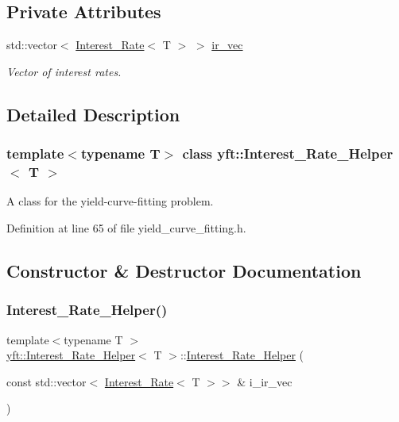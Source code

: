 \subsection*{Private Attributes}
\begin{DoxyCompactItemize}
\item 
std\+::vector$<$ \hyperlink{structyft_1_1_interest___rate}{Interest\+\_\+\+Rate}$<$ T $>$ $>$ \hyperlink{classyft_1_1_interest___rate___helper_aaa22a1a41fd5eead9ea61136ebc8446c}{ir\+\_\+vec}
\begin{DoxyCompactList}\small\item\em Vector of interest rates. \end{DoxyCompactList}\end{DoxyCompactItemize}


\subsection{Detailed Description}
\subsubsection*{template$<$typename T$>$\newline
class yft\+::\+Interest\+\_\+\+Rate\+\_\+\+Helper$<$ T $>$}

A class for the yield-\/curve-\/fitting problem. 

Definition at line 65 of file yield\+\_\+curve\+\_\+fitting.\+h.



\subsection{Constructor \& Destructor Documentation}
\mbox{\label{classyft_1_1_interest___rate___helper_a153c17e7c5545068f466a8f291e72dc9}} 
\subsubsection{\texorpdfstring{Interest\+\_\+\+Rate\+\_\+\+Helper()}{Interest\_Rate\_Helper()}}
{\footnotesize\ttfamily template$<$typename T $>$ \\
\hyperlink{classyft_1_1_interest___rate___helper}{yft\+::\+Interest\+\_\+\+Rate\+\_\+\+Helper}$<$ T $>$\+::\hyperlink{classyft_1_1_interest___rate___helper}{Interest\+\_\+\+Rate\+\_\+\+Helper} (\begin{DoxyParamCaption}\item[{const std\+::vector$<$ \hyperlink{structyft_1_1_interest___rate}{Interest\+\_\+\+Rate}$<$ T $>$$>$ \&}]{i\+\_\+ir\+\_\+vec }\end{DoxyParamCaption})\hspace{0.3cm}{\ttfamily [inline]}}



